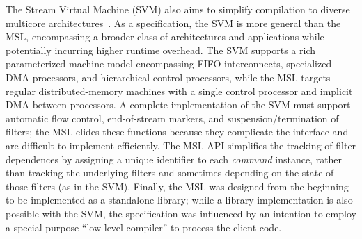 The Stream Virtual Machine (SVM) also aims to simplify compilation to
diverse multicore architectures~\cite{svm:specs,svm}.  As a specification,
the SVM is more general than the MSL, encompassing a broader class of
architectures and applications while potentially incurring higher
runtime overhead.  The SVM supports a rich parameterized machine model
encompassing FIFO interconnects, specialized DMA processors, and
hierarchical control processors, while the MSL targets regular
distributed-memory machines with a single control processor and
implicit DMA between processors.  A complete implementation of the SVM
must support automatic flow control, end-of-stream markers, and
suspension/termination of filters; the MSL elides these functions
because they complicate the interface and are difficult to implement
efficiently.  The MSL API simplifies the tracking of filter
dependences by assigning a unique identifier to each {\it command}
instance, rather than tracking the underlying filters and sometimes
depending on the state of those filters (as in the SVM).  Finally, the
MSL was designed from the beginning to be implemented as a standalone
library; while a library implementation is also possible with the SVM,
the specification was influenced by an intention to employ a
special-purpose ``low-level compiler'' to process the client code.


